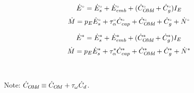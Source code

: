 


\begin{landscape}

\linespread{1}


\sectionsep{}

{
\begin{equation} \label{eq:E_acct_orig}
  \Eacctorig{}
\end{equation}
}
{
\begin{equation} \label{eq:M_acct_orig}
  \Macctorig{}
\end{equation}
}

\sectionsep{}

{
\begin{equation} \label{eq:E_acct_aemp}
  \Eacctaempl{}
\end{equation}
}
{
\begin{equation} \label{eq:M_acct_aemp}
  \Macctaempl{}
\end{equation}
}

\sectionsep{}

\derivsection{}
{
~

Note: $\rate{C}_{\omd} \equiv \rate{C}_{\om} + \tau_{\omega} \rate{C}_d$.

}
\end{landscape}
